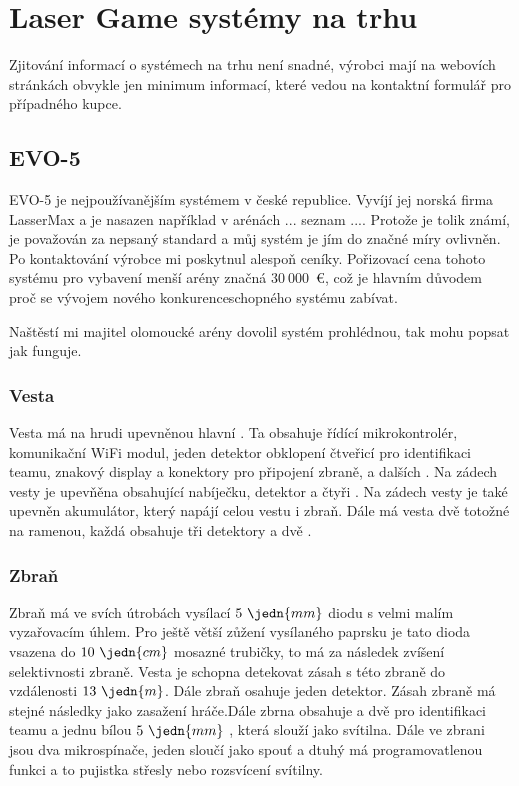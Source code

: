 \section{Laser Game systémy na trhu}
Zjitování informací o systémech na trhu není snadné, výrobci mají na webovích stránkách obvykle jen minimum informací, které vedou na kontaktní formulář pro případného kupce.

\subsection{EVO-5}

EVO-5 je nejpoužívanějším  systémem v české republice. Vyvíjí jej norská firma LasserMax a je nasazen například v arénách ... seznam .... Protože je tolik známí, je považován za nepsaný standard a můj systém je jím do značné míry ovlivněn. Po kontaktování výrobce mi poskytnul alespoň ceníky. Pořizovací cena tohoto systému pro vybavení menší arény značná $30~000$~€, což je hlavním důvodem proč se vývojem nového konkurenceschopného systému zabívat.

Naštěstí mi majitel olomoucké  arény dovolil systém prohlédnou, tak mohu popsat jak funguje.

\subsubsection{Vesta}
Vesta má na hrudi upevněnou hlavní . Ta obsahuje řídící mikrokontrolér, komunikační WiFi modul, jeden  detektor obklopení čtveřicí   pro identifikaci teamu, znakový display a konektory pro připojení zbraně, a dalších . Na zádech vesty je upevňěna  obsahující nabíječku,  detektor a čtyři  . Na zádech vesty je také upevněn akumulátor, který napájí celou vestu i zbraň. Dále má vesta dvě totožné  na ramenou, každá obsahuje tři  detektory a dvě  .

\subsubsection{Zbraň}
Zbraň má ve svích útrobách vysílací $5~\jedn{mm}$   diodu s velmi malím vyzařovacím úhlem. Pro ještě větší zůžení vysílaného paprsku je tato dioda vsazena do $10~\jedn{cm}$ mosazné trubičky, to má za následek zvíšení selektivnosti zbraně. Vesta je schopna detekovat zásah s této zbraně do vzdálenosti $13~\jedn{m}$. Dále zbraň osahuje jeden  detektor. Zásah zbraně má stejné následky jako zasažení hráče.Dále zbrna obsahuje a dvě   pro identifikaci teamu a jednu bílou $5~\jedn{mm}$ , která slouží jako svítilna. Dále ve zbrani jsou dva mikrospínače, jeden sloučí jako spouť a dtuhý má programovatlenou funkci a to pujistka střesly nebo rozsvícení svítilny.

